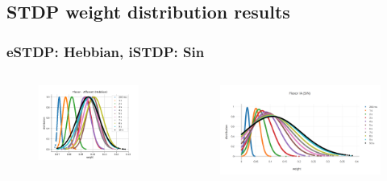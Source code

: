 \documentclass[12pt, aspectratio=169]{beamer}
\begin{document}
\subsection{STDP weight distribution results}

\begin{frame}
\frametitle{eSTDP: Hebbian, iSTDP: Sin}
\begin{columns}[c] %

\begin{figure}
\includegraphics[width=1\linewidth]{Gauss_Fl_Aff_Hebb}
\end{figure}
\begin{figure}
\includegraphics[width=1\linewidth]{Gauss_FlexorIA_sin}
\end{figure}
\end{columns}
\end{frame}
\end{document}
